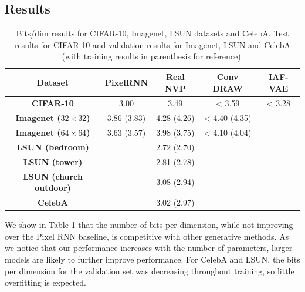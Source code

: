 \documentclass{article}
\newcommand{\jcom}[1]{\textcolor{darkgreen}{[jascha: #1]}}
\begin{document}
\subsection{Results}
\begin{table}
    \begin{center}
    \begin{tabular}{| c | c | c | c | c |}
      \hline
      \textbf{Dataset} & \textbf{PixelRNN} \citep{oord2016pixel} & \textbf{Real NVP} & \textbf{Conv DRAW \citep{gregor2016towards}} & \textbf{IAF-VAE \citep{kingma2016improving}} \\ \hline
      \textbf{CIFAR-10} & 3.00 & 3.49 & < 3.59 & < 3.28 \\ \hline
      \textbf{Imagenet ($32 \times 32$)} & 3.86 (3.83) & 4.28 (4.26) &  < 4.40 (4.35) & \cellcolor{black!25} \\ \hline
      \textbf{Imagenet ($64 \times 64$)} & 3.63 (3.57) & 3.98 (3.75) & < 4.10 (4.04) & \cellcolor{black!25} \\ \hline
      \textbf{LSUN (bedroom)} & \cellcolor{black!25} & 2.72 (2.70) & \cellcolor{black!25} & \cellcolor{black!25} \\ \hline
      \textbf{LSUN (tower)} & \cellcolor{black!25} & 2.81 (2.78) & \cellcolor{black!25} & \cellcolor{black!25} \\ \hline
      \textbf{LSUN (church outdoor)} & \cellcolor{black!25} & 3.08 (2.94) & \cellcolor{black!25} & \cellcolor{black!25} \\ \hline
      \textbf{CelebA} & \cellcolor{black!25} & 3.02 (2.97) & \cellcolor{black!25} & \cellcolor{black!25} \\ \hline
    \end{tabular}
    \caption{Bits/dim results for CIFAR-10, Imagenet, LSUN datasets and CelebA. Test results for CIFAR-10 and validation results for Imagenet, LSUN and CelebA (with training results in parenthesis for reference). %
    \label{fig:quant}}
    \end{center}
\end{table}

We show in Table \ref{fig:quant} that the number of bits per dimension, while not improving over the Pixel RNN \citep{oord2016pixel} baseline, is competitive with other generative methods. As we notice that our performance increases with the number of parameters, larger models are likely to further improve performance.
For CelebA and LSUN, the bits per dimension for the validation set was decreasing throughout training, so little overfitting is expected.
\end{document}
